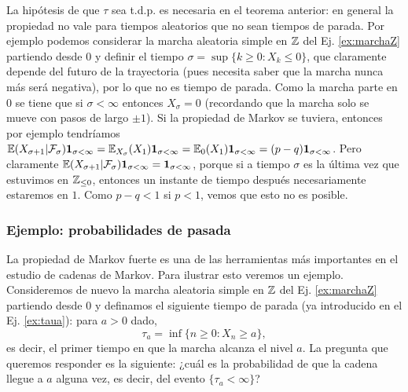 \begin{ex}
La hipótesis de que $\tau$ sea t.d.p. es necesaria en el teorema anterior: en general la propiedad no vale para tiempos aleatorios que no sean tiempos de parada.
Por ejemplo podemos considerar la marcha aleatoria simple en $\mathbb{Z}$ del Ej. \ref{ex:marchaZ} partiendo desde $0$ y definir el tiempo $\sigma=\sup\{k\geq0\!:X_k\leq0\}$, que claramente depende del futuro de la trayectoria (pues necesita saber que la marcha nunca más será negativa), por lo que no es tiempo de parada.
Como la marcha parte en $0$ se tiene que si $\sigma<\infty$ entonces $X_\sigma=0$ (recordando que la marcha solo se mueve con pasos de largo $\pm1$).
Si la propiedad de Markov se tuviera, entonces por ejemplo tendríamos $\mathbb{E}(X_{\sigma+1}|\mathcal{F}_\sigma)\mathbf{1}_{\sigma<\infty}=\mathbb{E}_{X_\sigma}(X_{1})\mathbf{1}_{\sigma<\infty}=\mathbb{E}_{0}(X_{1})\mathbf{1}_{\sigma<\infty}=(p-q)\mathbf{1}_{\sigma<\infty}$.
Pero claramente $\mathbb{E}(X_{\sigma+1}|\mathcal{F}_\sigma)\mathbf{1}_{\sigma<\infty}=\mathbf{1}_{\sigma<\infty}$, porque si a tiempo $\sigma$ es la última vez que estuvimos en $\mathbb{Z}_{\leq0}$, entonces un instante de tiempo después necesariamente estaremos en $1$.
Como $p-q<1$ si $p<1$, vemos que esto no es posible.
\end{ex}

\subsubsection{Ejemplo: probabilidades de pasada}

La propiedad de Markov fuerte es una de las herramientas más importantes en el estudio de cadenas de Markov.
Para ilustrar esto veremos un ejemplo.
Consideremos de nuevo la marcha aleatoria simple en $\mathbb{Z}$ del Ej. \ref{ex:marchaZ} partiendo desde $0$ y definamos el siguiente tiempo de parada (ya introducido en el Ej. \ref{ex:taua}): para $a>0$ dado,
\[\tau_{a}=\inf\{n\geq0\!:X_n\geq a\},\]
es decir, el primer tiempo en que la marcha alcanza el nivel $a$.
La pregunta que queremos responder es la siguiente: ¿cuál es la probabilidad de que la cadena llegue a $a$ alguna vez, es decir, del evento $\{\tau_a<\infty\}$?

